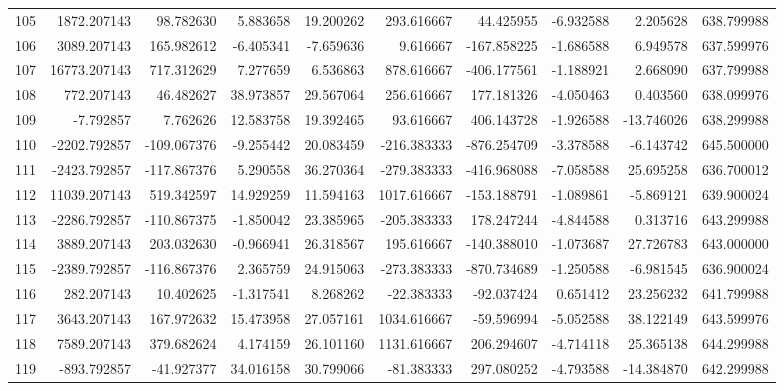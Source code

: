 \begin{tabular}{lrrrrrrrrr}
105 &   1872.207143 &    98.782630 &   5.883658 &  19.200262 &   293.616667 &    44.425955 &  -6.932588 &   2.205628 &  638.799988 \\
106 &   3089.207143 &   165.982612 &  -6.405341 &  -7.659636 &     9.616667 &  -167.858225 &  -1.686588 &   6.949578 &  637.599976 \\
107 &  16773.207143 &   717.312629 &   7.277659 &   6.536863 &   878.616667 &  -406.177561 &  -1.188921 &   2.668090 &  637.799988 \\
108 &    772.207143 &    46.482627 &  38.973857 &  29.567064 &   256.616667 &   177.181326 &  -4.050463 &   0.403560 &  638.099976 \\
109 &     -7.792857 &     7.762626 &  12.583758 &  19.392465 &    93.616667 &   406.143728 &  -1.926588 & -13.746026 &  638.299988 \\
110 &  -2202.792857 &  -109.067376 &  -9.255442 &  20.083459 &  -216.383333 &  -876.254709 &  -3.378588 &  -6.143742 &  645.500000 \\
111 &  -2423.792857 &  -117.867376 &   5.290558 &  36.270364 &  -279.383333 &  -416.968088 &  -7.058588 &  25.695258 &  636.700012 \\
112 &  11039.207143 &   519.342597 &  14.929259 &  11.594163 &  1017.616667 &  -153.188791 &  -1.089861 &  -5.869121 &  639.900024 \\
113 &  -2286.792857 &  -110.867375 &  -1.850042 &  23.385965 &  -205.383333 &   178.247244 &  -4.844588 &   0.313716 &  643.299988 \\
114 &   3889.207143 &   203.032630 &  -0.966941 &  26.318567 &   195.616667 &  -140.388010 &  -1.073687 &  27.726783 &  643.000000 \\
115 &  -2389.792857 &  -116.867376 &   2.365759 &  24.915063 &  -273.383333 &  -870.734689 &  -1.250588 &  -6.981545 &  636.900024 \\
116 &    282.207143 &    10.402625 &  -1.317541 &   8.268262 &   -22.383333 &   -92.037424 &   0.651412 &  23.256232 &  641.799988 \\
117 &   3643.207143 &   167.972632 &  15.473958 &  27.057161 &  1034.616667 &   -59.596994 &  -5.052588 &  38.122149 &  643.599976 \\
118 &   7589.207143 &   379.682624 &   4.174159 &  26.101160 &  1131.616667 &   206.294607 &  -4.714118 &  25.365138 &  644.299988 \\
119 &   -893.792857 &   -41.927377 &  34.016158 &  30.799066 &   -81.383333 &   297.080252 &  -4.793588 & -14.384870 &  642.299988 \\

\end{tabular}
